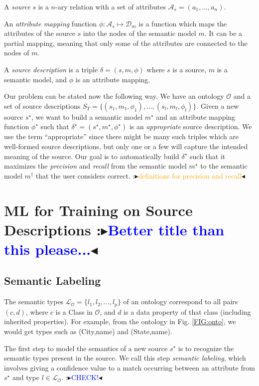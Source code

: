 \documentclass[letterpaper]{article} %
\newcommand{\authornote}[3]{
  {\fbox{\sc 
  #1}:$\blacktriangleright$\textcolor{#2}{\small{#3}}$\blacktriangleleft$}%
}
\newcommand{\ddg}[1]{\authornote{DDG}{blue}{#1}}
\newcommand{\npr}[1]{\authornote{NPR}{orange}{#1}}
\begin{document}
A \emph{source} $s$ is a $n$-ary relation with a set of attributes 
$\mathcal{A}_s = 
(a_1,...,a_n)$.

An \emph{attribute mapping} function $\phi : \mathcal{A}_s \mapsto 
\mathcal{D}_m$ is a function which
maps the attributes of the source $s$ into the nodes of the semantic model $m$. 
It can be a partial mapping, meaning that only some of the attributes
are connected to the nodes of $m$.

A \emph{source description} is a triple $\delta = (s, m, \phi)$ where $s$ is a 
source, 
$m$ is a semantic
model, and $\phi$ is an attribute mapping.

Our problem can be stated now the following way. We have an ontology 
$\mathcal{O}$ and a set of source descriptions $S_T = \{(s_1, m_1, \phi_1),..., 
(s_l, m_l, \phi_l)\}$.
Given a new source $s^\star$, we want to build a semantic model $m^\star$ and 
an attribute mapping function $\phi^\star$ such that 
$\delta^\star = (s^\star,m^\star,\phi^\star)$ is an \emph{appropriate} source 
description. We
use the term ``appropriate'' since there might be many such triples which are
well-formed source descriptions, but only one or a few will capture the intended
meaning of the source. 
Our goal is to automatically build $\delta^\star$ such that it maximizes the \emph{precision} and \emph{recall} from the semantic model 
$m^\star$ to the semantic model $m^\dag$ that the user considers correct. \npr{definitions for precision and recall}


\section{ML for Training on Source Descriptions \label{SEC:ML}\ddg{Better title 
than this 
please...}}


\subsection{Semantic Labeling}
The semantic types $\mathcal{L_O} = \{l_1, l_2, ..., l_p\}$ of an ontology 
correspond to all pairs $(c,d)$, where $c$ is a Class in $\mathcal{O}$, and $d$ 
is a data property of that class (including inherited properties). 
For example, from the ontology in Fig. \ref{FIG:onto}, we would get types such 
as 
(City,name) and (State,name).

The first step to model the semantics of a new source $s^\star$ is to recognize the semantic types present in the source. 
We call this step \emph{semantic labeling}, which involves giving a confidence value to a match occurring between an attribute from $s^\star$ and type $l \in 
\mathcal{L_O}$. \ddg{CHECK!}
\end{document}

